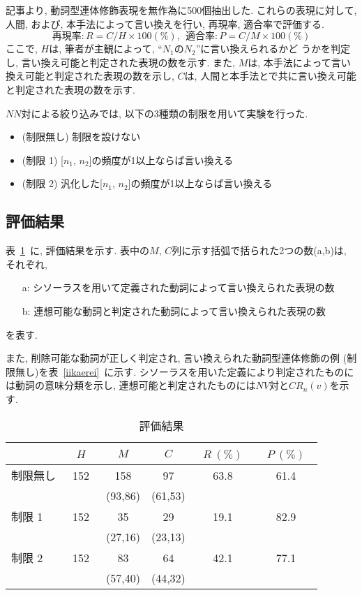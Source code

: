 記事より, 動詞型連体修飾表現を無作為に500個抽出した.
これらの表現に対して, 人間, および, 本手法によって言い換えを行い, 再現率, 
適合率で評価する.
$$
再現率: R=C/H × 100 (\%),\ \ 適合率: P=C/M × 100 (\%)
$$
ここで, $H$は, 筆者が主観によって, ``$N_1$の$N_2$''に言い換えられるかど
うかを判定し, 言い換え可能と判定された表現の数を示す.
また, $M$は, 本手法によって言い換え可能と判定された表現の数を示し, 
$C$は, 人間と本手法とで共に言い換え可能と判定された表現の数を示す.

$NN$対による絞り込みでは, 以下の3種類の制限を用いて実験を行った.
\begin{itemize}
\item (制限無し) 制限を設けない
\item (制限 1) [$n_1$, $n_2$]の頻度が1以上ならば言い換える
\item (制限 2) 汎化した[$n_1$, $n_2$]の頻度が1以上ならば言い換える
\end{itemize}

\subsection{評価結果}\label{kekka}
表~\ref{hyokakekka}~に, 評価結果を示す. 
表中の$M$, $C$列に示す括弧で括られた2つの数(a,b)は, それぞれ, 
\begin{itemize}
\item[a:] シソーラスを用いて定義された動詞によって言い換えられた表現の数
\item[b:] 連想可能な動詞と判定された動詞によって言い換えられた表現の数
\end{itemize}
を表す.

また, 削除可能な動詞が正しく判定され, 言い換えられた動詞型連体修飾の例
(制限無し)を表~\ref{iikaerei}~に示す.
シソーラスを用いた定義により判定されたものには動詞の意味分類を示し,
連想可能と判定されたものには$NV対$と$CR_{n}(v)$を示す.

\begin{table}[tbp]
 \begin{center}
 \caption{評価結果}
 \label{hyokakekka}
  \renewcommand{\arraystretch}{}
  \begin{tabular}{|l||c|c|c|c|c|}
   \hline
   &\ $H$\ & $M$ & $C$ &\ $R\ (\%)$\ &\ $P\ (\%)$\ \\
   \hline \hline
   制限無し &\ 152\ & 158    & 97      & 63.8 & 61.4\\
          &     & {\small (93,86)} & {\small (61,53)} &      & \\
   制限 1 & 152 & 35     & 29      & 19.1 & 82.9\\
          &     & {\small (27,16)} & {\small (23,13)} &      & \\
   制限 2 & 152 & 83     & 64      & 42.1 & 77.1\\
          &     & {\small (57,40)} & {\small (44,32)} &      & \\
   \hline
  \end{tabular}\\
 \end{center}
\end{table}


